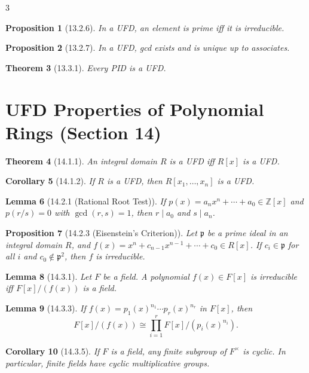 \documentclass[10pt,landscape]{article}
\newtheorem{theorem}{Theorem}[section]
\newtheorem{lemma}[theorem]{Lemma}
\newtheorem{proposition}[theorem]{Proposition}
\newtheorem{corollary}[theorem]{Corollary}
\begin{document}
\begin{multicols}{3}
\begin{proposition}[13.2.6]
In a UFD, an element is prime iff it is irreducible.
\end{proposition}

\begin{proposition}[13.2.7]
In a UFD, gcd exists and is unique up to associates.
\end{proposition}

\begin{theorem}[13.3.1]
Every PID is a UFD.
\end{theorem}

\section{UFD Properties of Polynomial Rings (Section 14)}

\begin{theorem}[14.1.1]
An integral domain $R$ is a UFD iff $R[x]$ is a UFD.
\end{theorem}

\begin{corollary}[14.1.2]
If $R$ is a UFD, then $R[x_1,\dots,x_n]$ is a UFD.
\end{corollary}

\begin{lemma}[14.2.1 (Rational Root Test)]
If $p(x)=a_nx^n+\cdots+a_0\in\mathbb{Z}[x]$ and $p(r/s)=0$ with $\gcd(r,s)=1$, then $r\mid a_0$ and $s\mid a_n$.
\end{lemma}

\begin{proposition}[14.2.3 (Eisenstein's Criterion)]
Let $\mathfrak{p}$ be a prime ideal in an integral domain $R$, and $f(x)=x^n+c_{n-1}x^{n-1}+\cdots+c_0\in R[x]$. If $c_i\in\mathfrak{p}$ for all $i$ and $c_0\notin\mathfrak{p}^2$, then $f$ is irreducible.
\end{proposition}

\begin{lemma}[14.3.1]
Let $F$ be a field. A polynomial $f(x)\in F[x]$ is irreducible iff $F[x]/(f(x))$ is a field.
\end{lemma}

\begin{lemma}[14.3.3]
If $f(x)=p_1(x)^{n_1}\cdots p_r(x)^{n_r}$ in $F[x]$, then
\[
F[x]/(f(x)) \cong \prod_{i=1}^r F[x]/(p_i(x)^{n_i}).
\]
\end{lemma}

\begin{corollary}[14.3.5]
If $F$ is a field, any finite subgroup of $F^\times$ is cyclic. In particular, finite fields have cyclic multiplicative groups.
\end{corollary}


\end{multicols}
\end{document}
